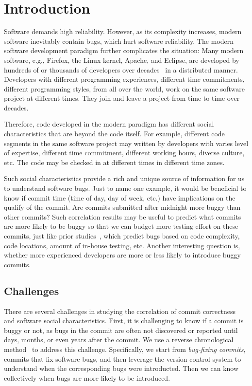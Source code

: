 \section{Introduction}


Software demands high reliability. However, as its complexity increases, 
modern software inevitably contain bugs, which hurt software reliability.
The modern software development paradigm further complicates the situation: 
Many modern software, e.g., Firefox, the Linux kernel, Apache, and Eclipse, 
are developed by hundreds of or thousands of developers over decades~\cite{ccomment} 
in a distributed manner. Developers with different programming experiences, 
different time commitments, different programming styles, from all over the world,
work on the same software project at different times. They join and leave a project 
from time to time over decades. 

Therefore, code developed in the modern paradigm has different social characteristics 
that are beyond the code itself. For example, different code segments in the same
software project may written by developers with  
varies level of expertise, different time 
commitment, different working hours, diverse culture, etc.
The code may be checked in at different times in different time zones. 

Such social characteristics provide a rich and unique source of information for us to 
understand software bugs. Just to name one example, it would be beneficial to know if  
commit time (time of day, day of week, etc.) have implications on the qualify of the commit. 
Are commits submitted after midnight more buggy than other commits? 
Such correlation results may be useful to predict what commits are more likely
to be buggy so that we can budget more testing effort on these commits, just
like prior studies~\cite{graves00predicting, guo04robust, ostrand05predicting},
which predict bugs based on code complexity, 
code locations, amount of in-house testing, etc. 
Another interesting question is, whether more experienced developers are more or less
likely to introduce buggy commits. 


\subsection{Challenges}
There are several challenges in studying the correlation of commit correctness and software social characteristics.
First, it is challenging to know if a commit is buggy or not,
as bugs in the commit are often not 
discovered or reported until days, months, or even years after the commit. 
We use a reverse chronological method~\cite{2005-changes} to address this challenge. 
Specifically, we start from {\em bug-fixing commits}, commits that fix software bugs, 
and then leverage the version control system to understand when the corresponding bugs were introducted. 
Then we can know collectively when bugs are more likely to be introduced. 

